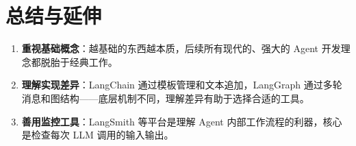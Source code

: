 \section{总结与延伸}

\begin{enumerate}
    \item \textbf{重视基础概念}：越基础的东西越本质，后续所有现代的、强大的 Agent 开发理念都脱胎于经典工作。
    \item \textbf{理解实现差异}：LangChain 通过模板管理和文本追加，LangGraph 通过多轮消息和图结构——底层机制不同，理解差异有助于选择合适的工具。
    \item \textbf{善用监控工具}：LangSmith 等平台是理解 Agent 内部工作流程的利器，核心是检查每次 LLM 调用的输入输出。
\end{enumerate}


